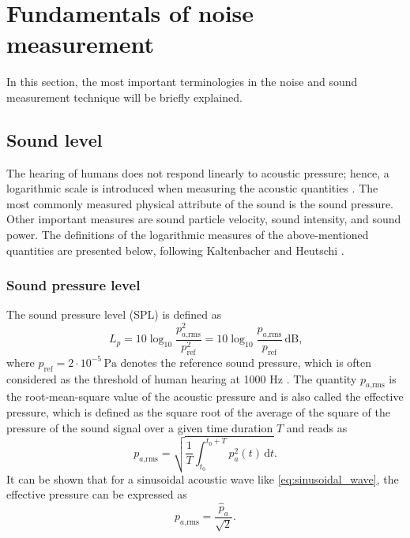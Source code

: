 \newpage
\section{Fundamentals of noise measurement}

In this section, the most important terminologies in the noise and sound measurement technique will be briefly explained.

\subsection{Sound level}

The hearing of humans does not respond linearly to acoustic pressure; hence, a logarithmic scale is introduced when measuring the acoustic quantities \cite{fahy_foundations_2001}. The most commonly measured physical attribute of the sound is the sound pressure. Other important measures are sound particle velocity, sound intensity, and sound power. The definitions of the logarithmic measures of the above-mentioned quantities are presented below, following Kaltenbacher \cite{kaltenbacher_computational_2018} and Heutschi \cite{heutschi_lecture_2016}.


\subsubsection*{Sound pressure level}
The sound pressure level (SPL) is defined as
\begin{equation}
	L_p = 10\log_{10}\frac{p_{a\text{,rms}}^2}{p_\text{ref}^2} = 10\log_{10}\frac{p_{a\text{,rms}}}{p_\text{ref}}\,\text{dB}\text{,}
\end{equation}
where $p_\text{ref} = 2\cdot10^{-5}\,\text{Pa}$ denotes the reference sound pressure, which is often considered as the threshold of human hearing at 1000 Hz \cite{sinambari_ingenieurakustik_2020}. The quantity $p_{a\text{,rms}}$ is the root-mean-square value of the acoustic pressure and is also called the effective pressure, which is defined as the square root of the average of the square of the pressure of the sound signal over a given time duration $T$ and reads as
\begin{equation}
	p_{a\text{,rms}} = \sqrt{\frac{1}{T} \int_{t_0}^{t_0 + T} p_a^2(t)\,\text{d}t}\text{.}
\end{equation}
It can be shown that for a sinusoidal acoustic wave like \cref{eq:sinusoidal_wave}, the effective pressure can be expressed as \cite{peterson_1972_handbook}
\begin{equation}
	p_{a\text{,rms}} = \frac{\hat{p}_a}{\sqrt{2}}\text{.}
\end{equation}

